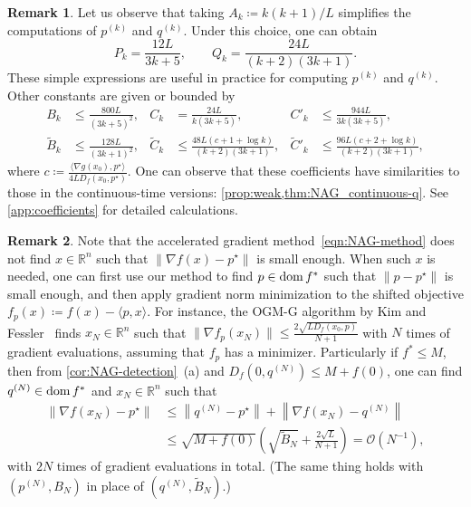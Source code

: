 \documentclass[11pt,a4paper]{article}
\theoremstyle{definition}
\newtheorem{rem}{Remark}[section]
\theoremstyle{plain}
\newcommand{\RR}{{\mathbb{R}}}
\newcommand{\dom}{\mathop{\rm dom}}
\begin{document}
\begin{rem}\label{rem:discrete_specific_coefficients}
    Let us observe that taking $A_k \coloneqq k(k + 1)/L$ simplifies the computations of $p^{(k)}$ and $q^{(k)}$.
    Under this choice, one can obtain
    \[
        P_k = \frac{12L}{3k + 5}, \qquad Q_k = \frac{24L}{(k + 2)(3k + 1)}.
    \]
    These simple expressions are useful in practice for computing $p^{(k)}$ and $q^{(k)}$.
    Other constants are given or bounded by
    \begin{align*}
        B_k &\le \frac{800L}{(3k + 5)^2},& C_k &= \frac{24L}{k(3k + 5)},& C'_k &\le \frac{944L}{3k(3k + 5)},\\
        \tilde B_k &\le \frac{128L}{(3k + 1)^2},& \tilde C_k &\le \frac{48L(c + 1 + \log k)}{(k + 2)(3k + 1)},& \tilde C'_k &\le \frac{96L(c + 2 + \log k)}{(k + 2)(3k + 1)},
    \end{align*}
    where $c \coloneqq \frac{\langle\nabla g(x_0), p^\star\rangle}{4LD_f(x_0, p^\star)}$.
    One can observe that these coefficients have similarities to those in the continuous-time versions: \cref{prop:weak,thm:NAG_continuous-q}.
    See \cref{app:coefficients} for detailed calculations.
\end{rem}

\begin{rem}
    Note that the accelerated gradient method~\eqref{eqn:NAG-method} does not find $x \in \RR^n$ such that $\|\nabla f(x) - p^\star\|$ is small enough.
    When such $x$ is needed, one can first use our method to find $p \in \dom f^\ast$ such that $\|p - p^\star\|$ is small enough, and then apply gradient norm minimization to the shifted objective $f_p(x) \coloneqq f(x) - \langle p, x\rangle$.
    For instance, the OGM-G algorithm by Kim and Fessler~\cite{KF2021} finds $x_N \in \RR^n$ such that $\|\nabla f_p(x_N)\| \le \frac{2\sqrt{LD_f(x_0, p)}}{N + 1}$ with $N$ times of gradient evaluations, assuming that $f_p$ has a minimizer.
    Particularly if $f^\ast \le M$, then from \cref{cor:NAG-detection}~(a) and $D_f\left(0, q^{(N)}\right) \le M + f(0)$, one can find $q^{(N)} \in \dom f^\ast$ and $x_{N} \in \RR^n$ such that
    \begin{align*}
        \left\|\nabla f(x_N) - p^\star\right\|
        &\le \left\|q^{(N)} - p^\star\right\| + \left\|\nabla f(x_N) - q^{(N)}\right\|\\
        &\le \sqrt{M + f(0)}\left(\sqrt{\tilde B_N} + \frac{2\sqrt{L}}{N + 1}\right) = \mathcal{O}(N^{-1}),
    \end{align*}
    with $2N$ times of gradient evaluations in total.
    (The same thing holds with $(p^{(N)}, B_N)$ in place of $(q^{(N)}, \tilde B_N)$.)
\end{rem}
\end{document}
